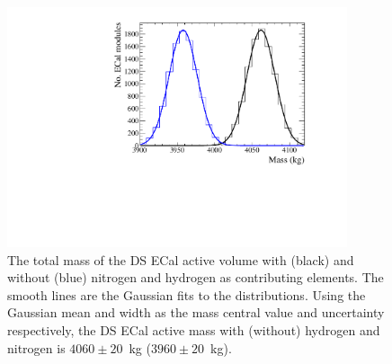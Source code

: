 \begin{figure}[b!]
  \centering
  \includegraphics[width=10cm]{images/measurement/systematics/detector/mass/TotalMass_DSECal.eps}
  \caption{The total mass of the DS ECal active volume with (black) and without (blue) nitrogen and hydrogen as contributing elements.  The smooth lines are the Gaussian fits to the distributions.  Using the Gaussian mean and width as the mass central value and uncertainty respectively, the DS ECal active mass with (without) hydrogen and nitrogen is $4060\pm20$~kg ($3960\pm20$~kg).}
  \label{fig:TotalMassDSECal}
\end{figure}
